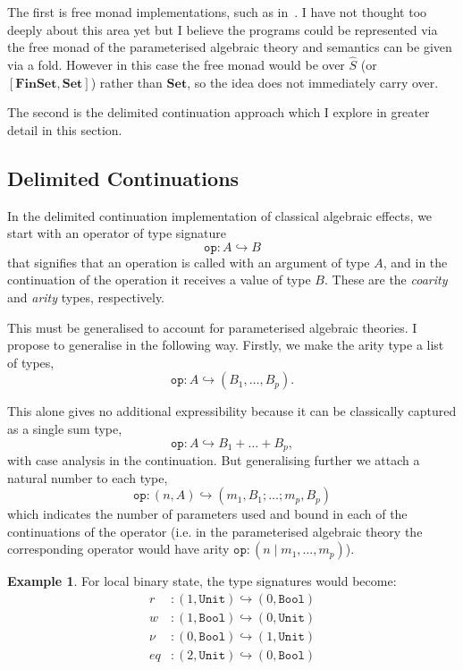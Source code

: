 \documentclass{scrartcl}
\theoremstyle{definition}
\newtheorem{example}[theorem]{Example}
\newcommand{\Set}{\mathbf{Set}}
\newcommand{\Fin}{\mathbf{FinSet}}
\newcommand{\op}{\mathtt{op}}
\newcommand{\Unit}{\mathtt{Unit}}
\newcommand{\Bool}{\mathtt{Bool}}
\begin{document}
The first is free monad implementations, such as in~\cite{wu_effect_2014}. I have not thought too deeply about this area yet but I believe the programs could be represented via the free monad of the parameterised algebraic theory and semantics can be given via a fold. However in this case the free monad would be over $\hat{S}$ (or $[\Fin,\Set]$) rather than $\Set$, so the idea does not immediately carry over.

The second is the delimited continuation approach which I explore in greater detail in this section.

\subsection{Delimited Continuations}

In the delimited continuation implementation of classical algebraic effects, we start with an operator of type signature
\[
    \op: A \hookrightarrow B
\]
that signifies that an operation is called with an argument of type $A$, and in the continuation of the operation it receives a value of type $B$. These are the \emph{coarity} and \emph{arity} types, respectively.

This must be generalised to account for parameterised algebraic theories. I propose to generalise in the following way. Firstly, we make the arity type a list of types,
\[
    \op: A \hookrightarrow (B_1,\dots, B_p).
\]

This alone gives no additional expressibility because it can be classically captured as a single sum type,
\[
    \op : A \hookrightarrow B_1 + \dots + B_p,
\]
with case analysis in the continuation. But generalising further we attach a natural number to each type,
\[
    \op : (n, A) \hookrightarrow (m_1,B_1;\dots ; m_p,B_p)
\]
which indicates the number of parameters used and bound in each of the continuations of the operator (i.e. in the parameterised algebraic theory the corresponding operator would have arity $\op : (n \mid m_1, \dots, m_p)$).


\begin{example}
For local binary state, the type signatures would become:
\begin{align*}
    r &: (1, \Unit) \hookrightarrow (0, \Bool) \\
    w &: (1, \Bool) \hookrightarrow (0, \Unit) \\
    \nu &: (0, \Bool) \hookrightarrow (1, \Unit) \\
    eq&: (2, \Unit) \hookrightarrow (0, \Bool)
\end{align*}
\end{example}
\end{document}
